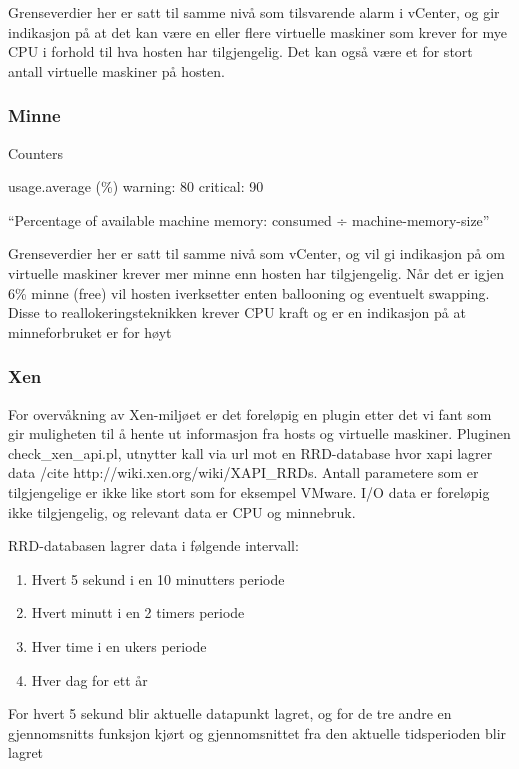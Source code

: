 Grenseverdier her er satt til samme nivå som tilsvarende alarm i vCenter, og gir indikasjon på at det kan være en eller flere virtuelle maskiner som krever for mye CPU i forhold til hva hosten har tilgjengelig. Det kan også være et for stort antall virtuelle maskiner på hosten. 

\subsubsection*{Minne}

Counters 

 usage.average (\%) warning: 80 critical: 90

“Percentage of available machine memory: consumed ÷ machine-memory-size”

Grenseverdier her er satt til samme nivå som vCenter, og vil gi indikasjon på om virtuelle maskiner krever mer minne enn hosten har tilgjengelig. Når det er igjen 6\% minne (free) vil hosten iverksetter enten ballooning og eventuelt swapping. Disse to reallokeringsteknikken krever CPU kraft og er en indikasjon på at minneforbruket er for høyt

\subsubsection{Xen}

For overvåkning av Xen-miljøet er det foreløpig en plugin etter det vi fant som gir muligheten til å hente ut informasjon fra hosts og virtuelle maskiner. Pluginen check\_xen\_api.pl, utnytter kall via url mot en RRD-database hvor xapi lagrer data /cite http://wiki.xen.org/wiki/XAPI\_RRDs. 
Antall parametere som er tilgjengelige er ikke like stort som for eksempel VMware. I/O data er foreløpig ikke tilgjengelig, og relevant data er CPU og minnebruk.

RRD-databasen lagrer data i følgende intervall:
\begin{enumerate}
	\item Hvert 5 sekund i en 10 minutters periode
	\item Hvert minutt i en 2 timers periode
	\item Hver time i en ukers periode
	\item Hver dag for ett år
\end{enumerate}

For hvert 5 sekund blir aktuelle datapunkt lagret, og for de tre andre en gjennomsnitts funksjon kjørt og gjennomsnittet fra den aktuelle tidsperioden blir lagret 

